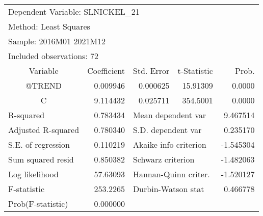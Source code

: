 \begin{tabular}{lrrrr}
\toprule
\multicolumn{3}{l}{Dependent Variable: SLNICKEL\_21}&\multicolumn{1}{c}{}&\multicolumn{1}{c}{}\\
\multicolumn{2}{l}{Method: Least Squares}&\multicolumn{1}{c}{}&\multicolumn{1}{c}{}&\multicolumn{1}{c}{}\\
\multicolumn{2}{l}{Sample: 2016M01 2021M12}&\multicolumn{1}{c}{}&\multicolumn{1}{c}{}&\multicolumn{1}{c}{}\\
\multicolumn{2}{l}{Included observations: 72}&\multicolumn{1}{c}{}&\multicolumn{1}{c}{}&\multicolumn{1}{c}{}\\
\midrule
\multicolumn{1}{c}{Variable}&\multicolumn{1}{r}{Coefficient}&\multicolumn{1}{r}{Std. Error}&\multicolumn{1}{r}{t-Statistic}&\multicolumn{1}{r}{Prob.}\\
\midrule
\multicolumn{1}{c}{@TREND}&\multicolumn{1}{r}{0.009946}&\multicolumn{1}{r}{0.000625}&\multicolumn{1}{r}{15.91309}&\multicolumn{1}{r}{0.0000}\\
\multicolumn{1}{c}{C}&\multicolumn{1}{r}{9.114432}&\multicolumn{1}{r}{0.025711}&\multicolumn{1}{r}{354.5001}&\multicolumn{1}{r}{0.0000}\\
\midrule
\multicolumn{1}{l}{R-squared}&\multicolumn{1}{r}{0.783434}&\multicolumn{2}{l}{Mean dependent var}&\multicolumn{1}{r}{9.467514}\\
\multicolumn{1}{l}{Adjusted R-squared}&\multicolumn{1}{r}{0.780340}&\multicolumn{2}{l}{S.D. dependent var}&\multicolumn{1}{r}{0.235170}\\
\multicolumn{1}{l}{S.E. of regression}&\multicolumn{1}{r}{0.110219}&\multicolumn{2}{l}{Akaike info criterion}&\multicolumn{1}{r}{-1.545304}\\
\multicolumn{1}{l}{Sum squared resid}&\multicolumn{1}{r}{0.850382}&\multicolumn{2}{l}{Schwarz criterion}&\multicolumn{1}{r}{-1.482063}\\
\multicolumn{1}{l}{Log likelihood}&\multicolumn{1}{r}{57.63093}&\multicolumn{2}{l}{Hannan-Quinn criter.}&\multicolumn{1}{r}{-1.520127}\\
\multicolumn{1}{l}{F-statistic}&\multicolumn{1}{r}{253.2265}&\multicolumn{2}{l}{Durbin-Watson stat}&\multicolumn{1}{r}{0.466778}\\
\multicolumn{1}{l}{Prob(F-statistic)}&\multicolumn{1}{r}{0.000000}&\multicolumn{1}{c}{}&\multicolumn{1}{c}{}&\multicolumn{1}{c}{}\\
\bottomrule
\end{tabular}
